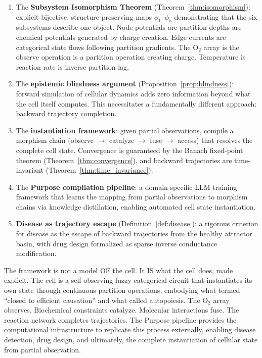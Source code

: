 \documentclass[twocolumn,10pt,a4paper]{article}
\theoremstyle{definition}
\theoremstyle{remark}
\begin{document}
\begin{enumerate}[label=(\arabic*)]
    \item The \textbf{Subsystem Isomorphism Theorem} (Theorem~\ref{thm:isomorphism}): explicit bijective, structure-preserving maps $\phi_1$--$\phi_5$ demonstrating that the six subsystems describe one object. Node potentials are partition depths are chemical potentials generated by charge creation. Edge currents are categorical state flows following partition gradients. The O$_2$ array is the observe operation is a partition operation creating charge. Temperature is reaction rate is inverse partition lag.

    \item The \textbf{epistemic blindness argument} (Proposition~\ref{prop:blindness}): forward simulation of cellular dynamics adds zero information beyond what the cell itself computes. This necessitates a fundamentally different approach: backward trajectory completion.

    \item The \textbf{instantiation framework}: given partial observations, compile a morphism chain (observe $\to$ catalyze $\to$ fuse $\to$ access) that resolves the complete cell state. Convergence is guaranteed by the Banach fixed-point theorem (Theorem~\ref{thm:convergence}), and backward trajectories are time-invariant (Theorem~\ref{thm:time_invariance}).

    \item The \textbf{Purpose compilation pipeline}: a domain-specific LLM training framework that learns the mapping from partial observations to morphism chains via knowledge distillation, enabling automated cell state instantiation.

    \item \textbf{Disease as trajectory escape} (Definition~\ref{def:disease}): a rigorous criterion for disease as the escape of backward trajectories from the healthy attractor basin, with drug design formalized as sparse inverse conductance modification.
\end{enumerate}

The framework is not a model OF the cell. It IS what the cell does, made explicit. The cell is a self-observing fuzzy categorical circuit that instantiates its own state through continuous partition operations, embodying what \citet{Rosen1991} termed ``closed to efficient causation'' and what \citet{VarelaMaturanaUribe1974} called autopoiesis. The O$_2$ array observes. Biochemical constraints catalyze. Molecular interactions fuse. The reaction network completes trajectories. The Purpose pipeline provides the computational infrastructure to replicate this process externally, enabling disease detection, drug design, and ultimately, the complete instantiation of cellular state from partial observation.
\end{document}
